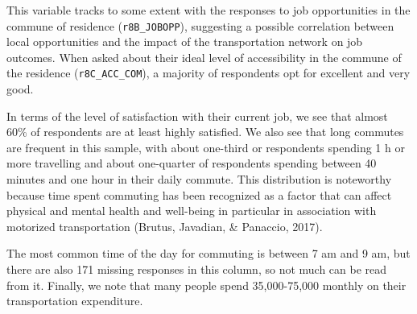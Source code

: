 \documentclass[
11pt, %
oneside, %
english, %
singlespacing, %
]{macthesis} %
\newcommand{\blandscape}{\begin{landscape}}
\newcommand{\elandscape}{\end{landscape}}
\begin{document}
This variable tracks to some extent with the responses to job opportunities in the commune of residence (\texttt{r8B\_JOBOPP}), suggesting a possible correlation between local opportunities and the impact of the transportation network on job outcomes. When asked about their ideal level of accessibility in the commune of the residence (\texttt{r8C\_ACC\_COM}), a majority of respondents opt for excellent and very good.

In terms of the level of satisfaction with their current job, we see that almost 60\% of respondents are at least highly satisfied. We also see that long commutes are frequent in this sample, with about one-third or respondents spending 1 h or more travelling and about one-quarter of respondents spending between 40 minutes and one hour in their daily commute. This distribution is noteworthy because time spent commuting has been recognized as a factor that can affect physical and mental health and well-being in particular in association with motorized transportation (Brutus, Javadian, \& Panaccio, 2017).

The most common time of the day for commuting is between 7 am and 9 am, but there are also 171 missing responses in this column, so not much can be read from it. Finally, we note that many people spend 35,000-75,000 monthly on their transportation expenditure.

\newpage
\blandscape
\begin{table}

\caption{\label{tab:unnamed-chunk-10}\label{tab:Travel-work-Descriptive}Variables regarding the commuting behavior of respondents}
\centering
{}
\end{table}
\elandscape
\newpage
\end{document}
